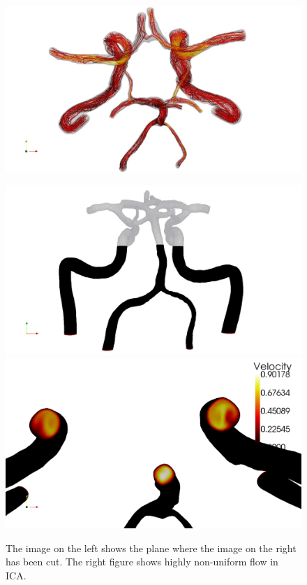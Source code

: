 \begin{figure}
          {\includegraphics[width=\fullfig]{chapters/kvs-2/pdf/cok_top_steam_white.pdf}}
\end{figure}

\begin{figure}
  \center
  \includegraphics[width=\largefig]{chapters/kvs-2/pdf/cok_slice.pdf} \\
  \includegraphics[width=\largefig]{chapters/kvs-2/pdf/cok_ica_vel_peak_syst.pdf}
  \caption{The image on the left shows the plane where the image on
    the right has been cut.  The right figure shows highly
    non-uniform flow in ICA.}
  \label{fig:kvs-2:cok_ica}
\end{figure}
